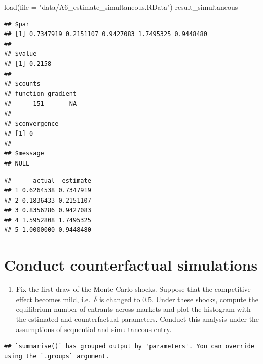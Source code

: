 \documentclass[
]{book}
\newenvironment{Shaded}{\begin{snugshade}}{\end{snugshade}}
\newcommand{\AttributeTok}[1]{\textcolor[rgb]{0.77,0.63,0.00}{#1}}
\newcommand{\FunctionTok}[1]{\textcolor[rgb]{0.00,0.00,0.00}{#1}}
\newcommand{\NormalTok}[1]{#1}
\newcommand{\OtherTok}[1]{\textcolor[rgb]{0.56,0.35,0.01}{#1}}
\newcommand{\SpecialCharTok}[1]{\textcolor[rgb]{0.00,0.00,0.00}{#1}}
\newcommand{\StringTok}[1]{\textcolor[rgb]{0.31,0.60,0.02}{#1}}
\providecommand{\tightlist}{%
  \setlength{\itemsep}{0pt}\setlength{\parskip}{0pt}}
\begin{document}
\begin{Shaded}
\begin{Highlighting}[]
\FunctionTok{load}\NormalTok{(}\AttributeTok{file =} \StringTok{"data/A6\_estimate\_simultaneous.RData"}\NormalTok{)}
\NormalTok{result\_simultaneous}
\end{Highlighting}
\end{Shaded}

\begin{verbatim}
## $par
## [1] 0.7347919 0.2151107 0.9427083 1.7495325 0.9448480
## 
## $value
## [1] 0.2158
## 
## $counts
## function gradient 
##      151       NA 
## 
## $convergence
## [1] 0
## 
## $message
## NULL
\end{verbatim}

\begin{Shaded}
\end{Shaded}

\begin{verbatim}
##      actual  estimate
## 1 0.6264538 0.7347919
## 2 0.1836433 0.2151107
## 3 0.8356286 0.9427083
## 4 1.5952808 1.7495325
## 5 1.0000000 0.9448480
\end{verbatim}

\hypertarget{conduct-counterfactual-simulations}{%
\section{Conduct counterfactual simulations}\label{conduct-counterfactual-simulations}}

\begin{enumerate}
\def\labelenumi{\arabic{enumi}.}
\tightlist
\item
  Fix the first draw of the Monte Carlo shocks. Suppose that the competitive effect becomes mild, i.e.~\(\delta\) is changed to 0.5. Under these shocks, compute the equilibrium number of entrants across markets and plot the histogram with the estimated and counterfactual parameters. Conduct this analysis under the assumptions of sequential and simultaneous entry.
\end{enumerate}

\begin{verbatim}
## `summarise()` has grouped output by 'parameters'. You can override using the `.groups` argument.
\end{verbatim}
\end{document}
